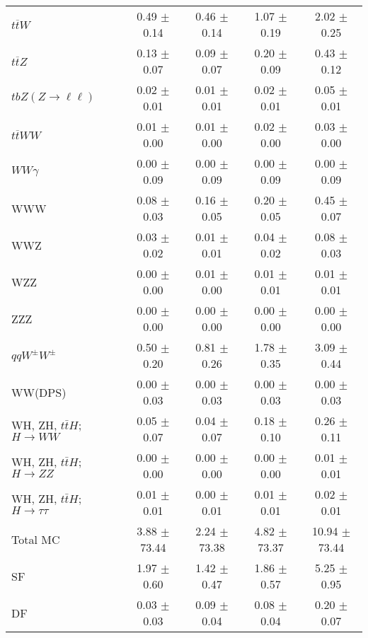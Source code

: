 \begin{tabular}{l|cccc}
                   $t\overline{t}W$ &  0.49 $\pm$  0.14 &  0.46 $\pm$  0.14 &  1.07 $\pm$  0.19 &  2.02 $\pm$  0.25 \\
                   $t\overline{t}Z$ &  0.13 $\pm$  0.07 &  0.09 $\pm$  0.07 &  0.20 $\pm$  0.09 &  0.43 $\pm$  0.12 \\
    $tbZ (Z \rightarrow \ell \ell)$ &  0.02 $\pm$  0.01 &  0.01 $\pm$  0.01 &  0.02 $\pm$  0.01 &  0.05 $\pm$  0.01 \\
                  $t\overline{t}WW$ &  0.01 $\pm$  0.00 &  0.01 $\pm$  0.00 &  0.02 $\pm$  0.00 &  0.03 $\pm$  0.00 \\
                         $WW\gamma$ &  0.00 $\pm$  0.09 &  0.00 $\pm$  0.09 &  0.00 $\pm$  0.09 &  0.00 $\pm$  0.09 \\
                                WWW &  0.08 $\pm$  0.03 &  0.16 $\pm$  0.05 &  0.20 $\pm$  0.05 &  0.45 $\pm$  0.07 \\
                                WWZ &  0.03 $\pm$  0.02 &  0.01 $\pm$  0.01 &  0.04 $\pm$  0.02 &  0.08 $\pm$  0.03 \\
                                WZZ &  0.00 $\pm$  0.00 &  0.01 $\pm$  0.00 &  0.01 $\pm$  0.01 &  0.01 $\pm$  0.01 \\
                                ZZZ &  0.00 $\pm$  0.00 &  0.00 $\pm$  0.00 &  0.00 $\pm$  0.00 &  0.00 $\pm$  0.00 \\
                 $qqW^{\pm}W^{\pm}$ &  0.50 $\pm$  0.20 &  0.81 $\pm$  0.26 &  1.78 $\pm$  0.35 &  3.09 $\pm$  0.44 \\
                            WW(DPS) &  0.00 $\pm$  0.03 &  0.00 $\pm$  0.03 &  0.00 $\pm$  0.03 &  0.00 $\pm$  0.03 \\
WH, ZH, $t\bar{t}H$; $H \rightarrow WW$ &  0.05 $\pm$  0.07 &  0.04 $\pm$  0.07 &  0.18 $\pm$  0.10 &  0.26 $\pm$  0.11 \\
WH, ZH, $t\bar{t}H$; $H \rightarrow ZZ$ &  0.00 $\pm$  0.00 &  0.00 $\pm$  0.00 &  0.00 $\pm$  0.00 &  0.01 $\pm$  0.01 \\
WH, ZH, $t\bar{t}H$; $H \rightarrow \tau\tau$ &  0.01 $\pm$  0.01 &  0.00 $\pm$  0.01 &  0.01 $\pm$  0.01 &  0.02 $\pm$  0.01 \\
\hline\hline
                           Total MC &  3.88 $\pm$ 73.44 &  2.24 $\pm$ 73.38 &  4.82 $\pm$ 73.37 & 10.94 $\pm$ 73.44 \\
\hline
                                 SF &  1.97 $\pm$  0.60 &  1.42 $\pm$  0.47 &  1.86 $\pm$  0.57 &  5.25 $\pm$  0.95 \\
                                 DF &  0.03 $\pm$  0.03 &  0.09 $\pm$  0.04 &  0.08 $\pm$  0.04 &  0.20 $\pm$  0.07 \\

\end{tabular}
